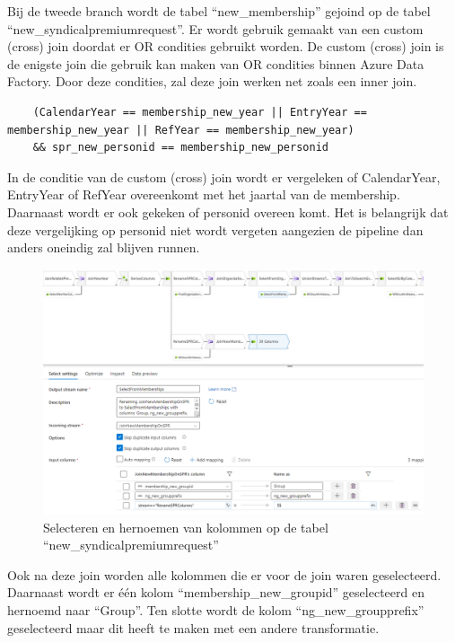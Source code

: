 Bij de tweede branch wordt de tabel ``new\_membership'' gejoind op de tabel ``new\_syndicalpremiumrequest''. Er wordt gebruik gemaakt van een custom (cross) join doordat er OR condities gebruikt worden. De custom (cross) join is de enigste join die gebruik kan maken van OR condities binnen Azure Data Factory. Door deze condities, zal deze join werken net zoals een inner join. 

\begin{verbatim}
    (CalendarYear == membership_new_year || EntryYear == membership_new_year || RefYear == membership_new_year) 
    && spr_new_personid == membership_new_personid
\end{verbatim}

In de conditie van de custom (cross) join wordt er vergeleken of CalendarYear, EntryYear of RefYear overeenkomt met het jaartal van de membership. Daarnaast wordt er ook gekeken of personid overeen komt. Het is belangrijk dat deze vergelijking op personid niet wordt vergeten aangezien de pipeline dan anders oneindig zal blijven runnen. 

\begin{figure}[H]
    \centering
    \includegraphics[width=1\textwidth]{./graphics/adf/bepalen_groep_8.png}
    \caption{Selecteren en hernoemen van kolommen op de tabel ``new\_syndicalpremiumrequest''}
    \label{fig:bepalengroep}
\end{figure}

Ook na deze join worden alle kolommen die er voor de join waren geselecteerd. Daarnaast wordt er één kolom ``membership\_new\_groupid'' geselecteerd en hernoemd naar ``Group''. Ten slotte wordt de kolom ``ng\_new\_groupprefix'' geselecteerd maar dit heeft te maken met een andere transformatie.

